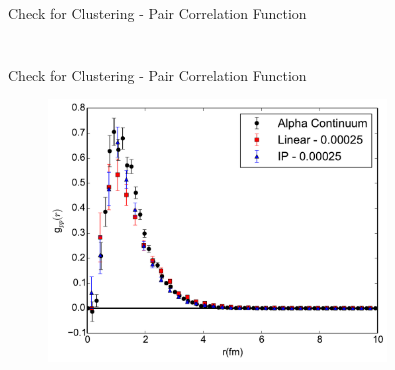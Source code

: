 \documentclass{beamer}
\begin{document}
\begin{frame}{Check for Clustering - Pair Correlation Function}
\begin{columns}
\begin{column}{0.4\textwidth}
\begin{figure}[h!]
\end{figure}
\end{column}
\end{columns}
\end{frame}

\begin{frame}{Check for Clustering - Pair Correlation Function}
\begin{figure}[h!]
   \centering
   \includegraphics[width=0.8\textwidth]{../figures/gpp_compare.pdf}
\end{figure}
\end{frame}
\end{document}
